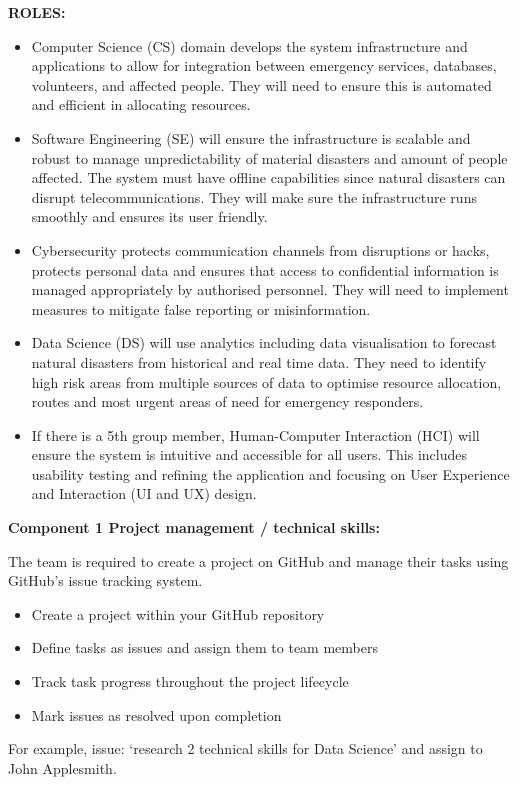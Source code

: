 \documentclass[a4paper, 11pt]{report}
\begin{document}
\textbf{ROLES:}
\begin{itemize}
    \item Computer Science (CS) domain develops the system infrastructure and applications to allow for integration between emergency services, databases, volunteers, and affected people. They will need to ensure this is automated and efficient in allocating resources.
    \item Software Engineering (SE) will ensure the infrastructure is scalable and robust to manage unpredictability of material disasters and amount of people affected. The system must have offline capabilities since natural disasters can disrupt telecommunications. They will make sure the infrastructure runs smoothly and ensures its user friendly.
    \item Cybersecurity protects communication channels from disruptions or hacks, protects personal data and ensures that access to confidential information is managed appropriately by authorised personnel. They will need to implement measures to mitigate false reporting or misinformation.
    \item Data Science (DS) will use analytics including data visualisation to forecast natural disasters from historical and real time data. They need to identify high risk areas from multiple sources of data to optimise resource allocation, routes and most urgent areas of need for emergency responders.
    \item If there is a 5th group member, Human-Computer Interaction (HCI) will ensure the system is intuitive and accessible for all users. This includes usability testing and refining the application and focusing on User Experience and Interaction (UI and UX) design.
\end{itemize}

\textbf{Component 1 Project management / technical skills:}

The team is required to create a project on GitHub and manage their tasks using GitHub’s issue tracking system.

\begin{itemize}
    \item Create a project within your GitHub repository
    \item Define tasks as issues and assign them to team members
    \item Track task progress throughout the project lifecycle
    \item Mark issues as resolved upon completion
\end{itemize}
For example, issue: ‘research 2 technical skills for Data Science’ and assign to John Applesmith. \\[2mm]
\end{document}
